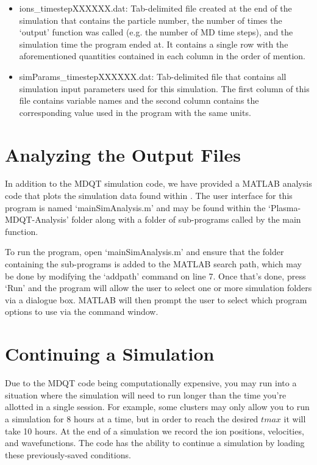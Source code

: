 \documentclass{article}
\begin{document}
\begin{itemize}
		\item ions\_timestepXXXXXX.dat: Tab-delimited file created at the end of the simulation that contains the particle number, the number of times the `output' function was called (e.g. the number of MD time steps), and the simulation time the program ended at. It contains a single row with the aforementioned quantities contained in each column in the order of mention.
		
		\item simParams\_timestepXXXXXX.dat: Tab-delimited file that contains all simulation input parameters used for this simulation. The first column of this file contains variable names and the second column contains the corresponding value used in the program with the same units.
		
		
	\end{itemize}
	
	\section{Analyzing the Output Files} \label{plotting data}
	
	In addition to the MDQT simulation code, we have provided a MATLAB analysis code that plots the simulation data found within \cite{glk2019}. The user interface for this program is named `mainSimAnalysis.m' and may be found within the `Plasma-MDQT-Analysis' folder along with a folder of sub-programs called by the main function.
	
	To run the program, open `mainSimAnalysis.m' and ensure that the folder containing the sub-programs is added to the MATLAB search path, which may be done by modifying the `addpath' command on line 7. Once that's done, press `Run' and the program will allow the user to select one or more simulation folders via a dialogue box. MATLAB will then prompt the user to select which program options to use via the command window. 
	
	\section{Continuing a Simulation} \label{continue simulation}
	
	Due to the MDQT code being computationally expensive, you may run into a situation where the simulation will need to run longer than the time you're allotted in a single session. For example, some clusters may only allow you to run a simulation for 8 hours at a time, but in order to reach the desired $tmax$ it will take 10 hours. At the end of a simulation we record the ion positions, velocities, and wavefunctions. The code has the ability to continue a simulation by loading these previously-saved conditions.
	
\end{document}
